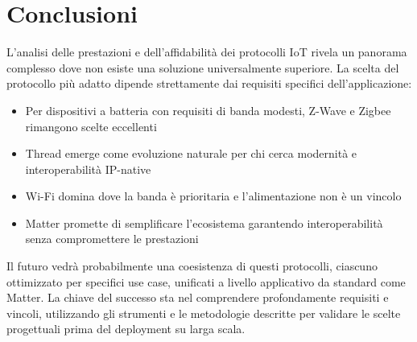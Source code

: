 \section{Conclusioni}

L'analisi delle prestazioni e dell'affidabilità dei protocolli IoT rivela un panorama complesso dove non esiste una soluzione universalmente superiore. La scelta del protocollo più adatto dipende strettamente dai requisiti specifici dell'applicazione:

\begin{itemize}
    \item Per dispositivi a batteria con requisiti di banda modesti, Z-Wave e Zigbee rimangono scelte eccellenti
    \item Thread emerge come evoluzione naturale per chi cerca modernità e interoperabilità IP-native
    \item Wi-Fi domina dove la banda è prioritaria e l'alimentazione non è un vincolo
    \item Matter promette di semplificare l'ecosistema garantendo interoperabilità senza compromettere le prestazioni
\end{itemize}

Il futuro vedrà probabilmente una coesistenza di questi protocolli, ciascuno ottimizzato per specifici use case, unificati a livello applicativo da standard come Matter. La chiave del successo sta nel comprendere profondamente requisiti e vincoli, utilizzando gli strumenti e le metodologie descritte per validare le scelte progettuali prima del deployment su larga scala.
